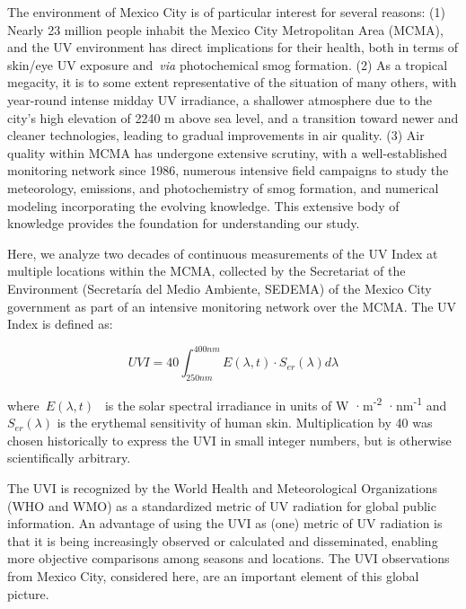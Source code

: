 \documentclass[10pt]{article}
\begin{document}
The environment of Mexico City is of particular interest for several
reasons: (1) Nearly 23 million people inhabit the Mexico City
Metropolitan Area (MCMA), and the UV environment has direct implications
for their health, both in terms of skin/eye UV exposure and~\emph{via}
photochemical smog formation. (2) As a tropical megacity, it is to some
extent representative of the situation of many others, with year-round
intense midday UV irradiance, a shallower atmosphere due to the city's
high elevation of 2240 m above sea level, and a transition toward newer
and cleaner technologies, leading to gradual improvements in air
quality. (3) Air quality within MCMA has undergone extensive scrutiny,
with a well-established monitoring network since
1986,\cite{rama} numerous intensive field campaigns to study the
meteorology, emissions, and photochemistry of smog
formation,\cite{Doran_1998,Molina_2007,Molina_2010} and numerical modeling incorporating the
evolving knowledge.\cite{Jazcilevich_2005,Tie_2007,Zhang_2009,Zavala_2020} This extensive body of knowledge
provides the foundation for understanding our study.

Here, we analyze two decades of continuous measurements of the UV Index
at multiple locations within the MCMA, collected by the Secretariat of
the Environment (Secretaría del Medio Ambiente, SEDEMA) of the Mexico
City government as part of an intensive monitoring network over the
MCMA.\cite{ambiente} The UV Index is defined as:

\begin{equation}
  \label{eq:UVI}
  UVI=40 \int_{250nm}^{400nm} E\left(\lambda,t\right) \cdot S_{er}(\lambda) d\lambda
\end{equation}

where~\(E(\lambda,t)\)\emph{~} is the solar spectral irradiance in
units of W ·m\textsuperscript{-2} ·nm\textsuperscript{-1}
and~\(S_{er}\left(\lambda\right)\) is the erythemal sensitivity of human
skin.\cite{who2002,Webb_2011} Multiplication by 40 was chosen historically to
express the UVI in small integer numbers, but is otherwise
scientifically arbitrary.

The UVI is recognized by the World Health and Meteorological
Organizations (WHO and WMO) as a standardized metric of UV
radiation\cite{who2002} for global public information. An advantage
of using the UVI as (one) metric of UV radiation is that it is being
increasingly observed or calculated and disseminated, enabling more
objective comparisons among seasons and locations. The UVI observations
from Mexico City, considered here, are an important element of this
global picture. ~
\end{document}
